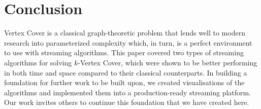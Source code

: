\section{Conclusion}

Vertex Cover is a classical graph-theoretic problem that lends well to modern
research into parameterized complexity which, in turn, is a perfect environment
to use with streaming algorithms. This paper covered two types of streaming
algorithms for solving \(k\)-Vertex Cover, which were shown to be better
performing in both time and space compared to their classical counterparts. In
building a foundation for further work to be built upon, we created
visualisations of the algorithms and implemented them into a production-ready
streaming platform. Our work invites others to continue this foundation that we
have created here.

